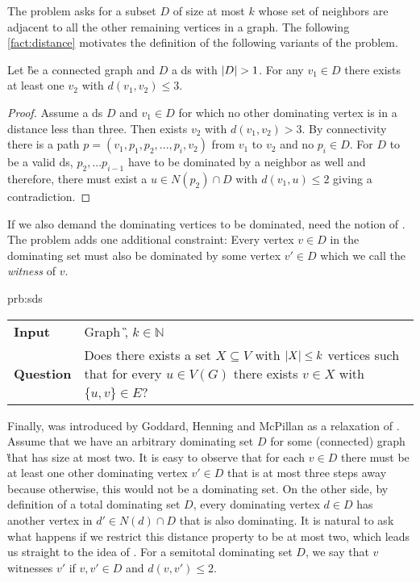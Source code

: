 The \dom problem asks for a subset $D$ of size at most $k$ whose set of neighbors are adjacent to all the other remaining vertices in a graph.
The following \cref{fact:distance} motivates the definition of the following variants of the problem.
\begin{fact}\label{fact:distance} Let \G be a connected graph and $D$ a ds with $\abs{D} > 1$. 
For any $v_1 \in D$ there exists at least one $v_2$ with $d(v_1,v_2) \leq 3$.
\end{fact}
\begin{proof}
Assume a ds $D$ and $v_1 \in D$ for which no other dominating vertex is in a distance less than three.
Then exists $v_2$ with $d(v_1,v_2) > 3$. 
By connectivity there is a path $p = (v_1, p_1, p_2, ...,  p_i, v_2)$ from $v_1$ to $v_2$ and no $p_i \in D $. 
For $D$ to be a valid ds, $p_2,...p_{i-1}$ have to be dominated by a neighbor as well and therefore, there must exist a $u \in N(p_2) \cap D$ with $d(v_1, u) \leq 2$ giving a contradiction.
\end{proof}

If we also demand the dominating vertices to be dominated, need the notion of \tdomin.
The \tdom problem adds one additional constraint: Every vertex $v \in D$ in the dominating set must also be dominated by some vertex $v' \in D$ which we call the \textit{witness} of $v$.

\begin{prb}{prb:sds}
    \begin{tabularx}{1.0\textwidth}{>{\hsize=0.30\hsize}X>{\hsize=0.8\hsize}X}
        \textbf{Input} & Graph \G, $k \in \mathbb{N}$\\
        \textbf{Question} & Does there exists a set $X \subseteq V$ with $\abs{X}\leq k$ vertices such that for every $u \in V(G)$ there exists $v \in X$ with $\{u,v\} \in E$? \\
    \end{tabularx}
\end{prb}

Finally, \sdomin was introduced by Goddard, Henning and McPillan \cite{Goddard2014} as a relaxation of \tdomin. 
Assume that we have an arbitrary dominating set $D$ for some (connected) graph \G that has size at most two.
It is easy to observe that for each $v \in D$ there must be at least one other dominating vertex $v' \in D$ that is at most three steps away because otherwise, this would not be a dominating set. 
On the other side, by definition of a total dominating set $D$, every dominating vertex $d \in D$ has another vertex in $d' \in N(d) \cap D$ that is also dominating.
It is natural to ask what happens if we restrict this distance property to be at most two, which leads us straight to the idea of \sdomin.
For a semitotal dominating set $D$, we say that $v$ witnesses $v'$ if $v,v' \in D$ and $d(v,v') \leq 2$.

